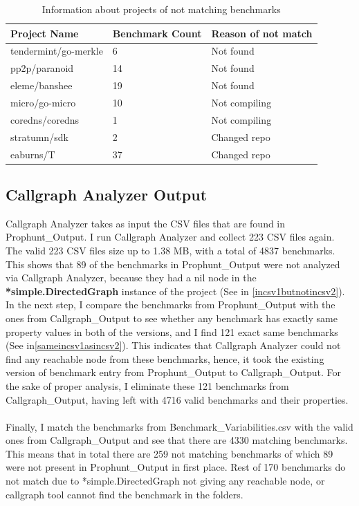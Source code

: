 \documentclass{seal_thesis}
\begin{document}
\begin{table}
\begin{longtable}[c]{@{}lll@{}}
	\caption{Information about projects of not matching benchmarks}
	\label{table:infinalnotcsv1}\\
	\toprule
	Project Name & Benchmark Count & Reason of not match \\* \midrule
	\endfirsthead
	\endhead
	\bottomrule
	\endfoot
	\endlastfoot
	tendermint/go-merkle & 6 & Not found \\
	pp2p/paranoid & 14 & Not found \\
	eleme/banshee & 19 & Not found \\
	micro/go-micro & 10 & Not compiling \\
	coredns/coredns & 1 & Not compiling \\
	stratumn/sdk & 2 & Changed repo \\
	eaburns/T & 37 & Changed repo \\* \bottomrule
\end{longtable}
\end{table}


\subsection{Callgraph Analyzer Output}
Callgraph Analyzer takes as input the CSV files that are found in Prophunt\_Output. I run Callgraph Analyzer and collect 223 CSV files again. The valid 223 CSV files size up to 1.38 MB, with a total of 4837 benchmarks. This shows that 89 of the benchmarks in Prophunt\_Output were not analyzed via Callgraph Analyzer, because they had a nil node in the \textbf{*simple.DirectedGraph} instance of the project (See in \ref{incsv1butnotincsv2}). In the next step, I compare the benchmarks from Prophunt\_Output with the ones from Callgraph\_Output to see whether any benchmark has exactly same property values in both of the versions, and I find 121 exact same benchmarks (See in\ref{sameincsv1asincsv2}). This indicates that Callgraph Analyzer could not find any reachable node from these benchmarks, hence, it took the existing version of benchmark entry from Prophunt\_Output to Callgraph\_Output. For the sake of proper analysis, I eliminate these 121 benchmarks from Callgraph\_Output, having left with 4716 valid benchmarks and their properties.\\
\\
Finally, I match the benchmarks from Benchmark\_Variabilities.csv with the valid ones from Callgraph\_Output and see that there are 4330 matching benchmarks. This means that in total there are 259 not matching benchmarks of which 89 were not present in Prophunt\_Output in first place. Rest of 170 benchmarks do not match due to *simple.DirectedGraph not giving any reachable node, or callgraph tool cannot find the benchmark in the folders. 
\end{document}
